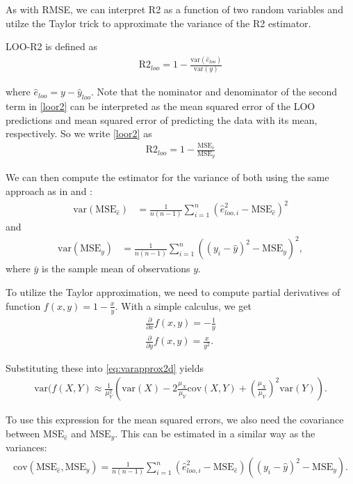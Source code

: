 \documentclass{article}
\begin{document}
As with RMSE, we can interpret R2 as a function of two random variables and utilze the Taylor trick to approximate the variance of the R2 estimator.

LOO-R2 is defined as
\begin{align}
\text{R2}_{loo} = 1 - \frac{\text{var}(\hat{e}_{loo}) }{ \text{var}(y)} \label{loor2}
\end{align}

where $\hat{e}_{loo} = y - \hat{y}_{loo}$. Note that the nominator and denominator of the second term in \eqref{loor2} can be interpreted as the mean squared error of the LOO predictions and mean squared error of predicting the data with its mean, respectively. So we write \eqref{loor2} as 
\begin{align}
    \text{R2}_{loo} = 1 - \frac{\text{MSE}_{\hat{e}} }{ \text{MSE}_y} \label{mser2}
\end{align}

We can then compute the estimator for the variance of both using the same approach as in \cite{sivula_uncertainty_2022} and \cite{vehtari_practical_2016}:
\begin{align}
    \text{var}(\text{MSE}_{\hat{e}}) &= \frac{1}{n (n-1)} \sum_{i = 1}^n \left( \hat{e}_{loo, i}^2 - \text{MSE}_{\hat{e}} \right)^2 \label{vare}
\end{align}
and
\begin{align}
    \text{var}(\text{MSE}_y) &= \frac{1}{n (n-1)} \sum_{i = 1}^n \left( (y_i - \hat{y})^2 -\text{MSE}_y \right)^2 \label{vary},
\end{align}
where $\bar{y}$ is the sample mean of observations $y$. 

To utilize the Taylor approximation, we need to compute partial derivatives of function $f(x,y) = 1 - \frac{x}{y}$. With a simple calculus, we get
\begin{align}
    \frac{\partial}{\partial x}f(x,y) = -\frac{1}{y} \\
    \frac{\partial}{\partial y}f(x,y) = \frac{x}{y^2}.
\end{align}

Substituting these into \eqref{eq:varapprox2d} yields
\begin{align}
    \text{var}(f(X, Y) \approx \frac{1}{\mu_Y^2} \left( \text{var}(X) - 2 \frac{\mu_X}{\mu_Y} \text{cov}(X,Y) + \left( \frac{\mu_X}{\mu_Y} \right)^2 \text{var}(Y) \right) \label{ratiovar}.
\end{align}

 To use this expression for the mean squared errors, we also need the covariance between $\text{MSE}_{\hat{e}}$ and $\text{MSE}_y$. This can be estimated in a similar way as the variances:
 \begin{align}
     \text{cov}(\text{MSE}_{\hat{e}}, \text{MSE}_{y} ) = \frac{1}{n (n -1 )} \sum_{i = 1}^n \left( \hat{e}_{loo, i}^2 - \text{MSE}_{\hat{e}} \right) \left( (y_i - \hat{y})^2 -\text{MSE}_y \right) \label{cov}.
 \end{align}
 
\end{document}
